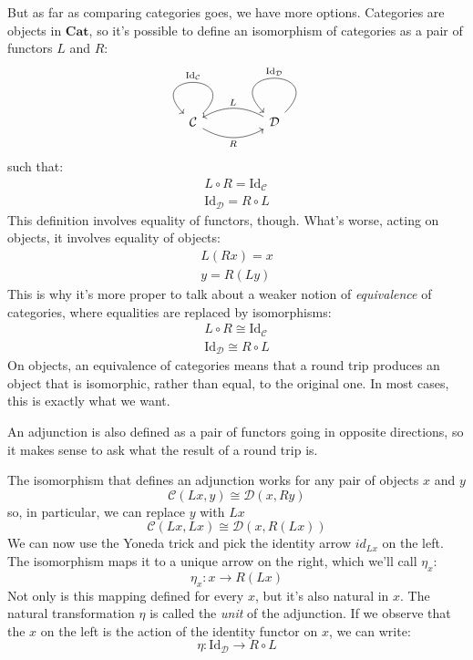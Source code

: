 \documentclass[DaoFP]{subfiles}
\begin{document}
But as far as comparing categories goes, we have more options. Categories are objects in $\mathbf{Cat}$, so it's possible to define an isomorphism of categories as a pair of functors $L$ and $R$:
\[
 \begin{tikzcd}
  \mathcal{C}
  \arrow[rr, bend right, "R"']
  \arrow[loop, "\text{Id}_{ \mathcal{C}} "']
  &&
  \mathcal{D}
  \arrow[ll, bend right, "L"']
  \arrow[loop, "\text{Id}_{ \mathcal{D}} "']
  \end{tikzcd}
\]
such that:
\begin{align*}
L \circ R = \text{Id}_{ \mathcal{C}} \\
\text{Id}_{ \mathcal{D}} = R \circ L 
\end{align*}
This definition involves equality of functors, though. What's worse, acting on objects, it involves equality of objects:
\begin{align*}
 L (R x) = x \\
 y = R (L y)
\end{align*}
This is why it's more proper to talk about a weaker notion of \emph{equivalence} of categories, where equalities are replaced by isomorphisms:
\begin{align*}
L \circ R \cong \text{Id}_{ \mathcal{C}} \\
 \text{Id}_{ \mathcal{D}} \cong R \circ L 
\end{align*}
On objects, an equivalence of categories means that a round trip produces an object that is isomorphic, rather than equal, to the original one. In most cases, this is exactly what we want.

An adjunction is also defined as a pair of functors going in opposite directions, so it makes sense to ask what the result of a round trip is. 

The isomorphism that defines an adjunction works for any pair of objects $x$ and $y$
\[  \mathcal{C} (L x, y) \cong \mathcal{D}( x , R y)\]
so, in particular, we can replace $y$ with $L x$
\[  \mathcal{C} (L x, L x) \cong \mathcal{D}( x , R (L x))\]
We can now use the Yoneda trick and pick the identity arrow $id_{L x}$ on the left. The isomorphism maps it to a unique arrow on the right, which we'll call $\eta_x$:
\[ \eta_x \colon x \to R ( L x) \]
Not only is this mapping defined for every $x$, but it's also natural in $x$. The natural transformation $\eta$ is called the \emph{unit} of the adjunction. If we observe that the $x$ on the left is the action of the identity functor on $x$, we can write:
\[ \eta \colon \text{Id}_{\mathcal{D}} \to R \circ L \]
\end{document}
